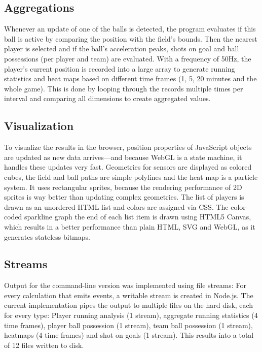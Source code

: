 \documentclass{sig-alternate}
\begin{document}
\subsection{Aggregations}

Whenever an update of one of the balls is detected,
the program evaluates if this ball is active
by comparing the position with the field’s bounds.
Then the nearest player is selected
and if the ball’s acceleration peaks,
shots on goal and ball possessions
(per player and team) are evaluated.
With a frequency of 50Hz, the player’s current position
is recorded into a large array to generate running statistics
and heat maps based on different time frames
(1, 5, 20 minutes and the whole game).
This is done by looping through the records
multiple times per interval
and comparing all dimensions to create aggregated values.

\subsection{Visualization}

To visualize the results in the browser,
position properties of JavaScript objects are updated
as new data arrives---and because WebGL is a state machine,
it handles these updates very fast.
Geometries for sensors are displayed as colored cubes,
the field and ball paths are simple polylines
and the heat map is a particle system.
It uses rectangular sprites, because the rendering performance
of 2D sprites is way better than updating complex geometries.
The list of players is drawn as an unordered HTML list
and colors are assigned via CSS.
The color-coded sparkline graph the end of each list item
is drawn using HTML5 Canvas,
which results in a better performance than plain HTML,
SVG and WebGL, as it generates stateless bitmaps.

\subsection{Streams}

Output for the command-line version was implemented
using file streams: For every calculation that emits events,
a writable stream is created in Node.js.
The current implementation pipes the output to multiple files
on the hard disk, each for every type:
Player running analysis (1 stream),
aggregate running statistics (4 time frames),
player ball possession (1 stream),
team ball possession (1 stream),
heatmaps (4 time frames) and shot on goals (1 stream).
This results into a total of 12 files written to disk.
\end{document}
